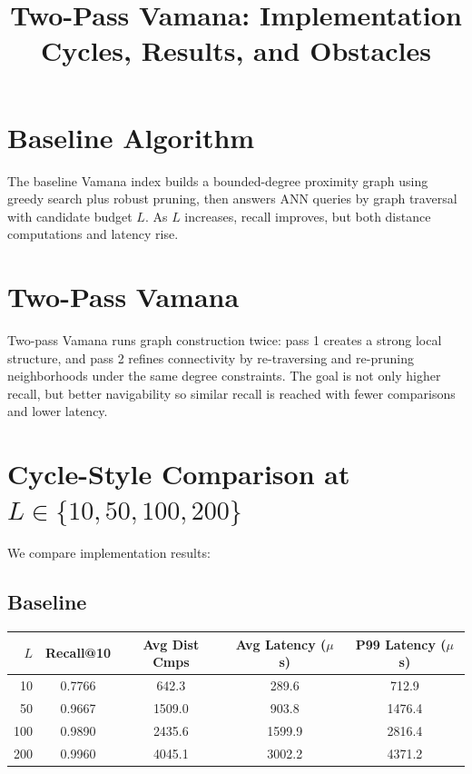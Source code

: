 \documentclass[11pt]{article}
\title{Two-Pass Vamana: Implementation Cycles, Results, and Obstacles}
\begin{document}
\maketitle

\section*{Baseline Algorithm}
The baseline Vamana index builds a bounded-degree proximity graph using greedy search plus robust pruning, then answers ANN queries by graph traversal with candidate budget $L$. As $L$ increases, recall improves, but both distance computations and latency rise.

\section*{Two-Pass Vamana}
Two-pass Vamana runs graph construction twice: pass 1 creates a strong local structure, and pass 2 refines connectivity by re-traversing and re-pruning neighborhoods under the same degree constraints. The goal is not only higher recall, but better navigability so similar recall is reached with fewer comparisons and lower latency.

\section*{Cycle-Style Comparison at $L\in\{10,50,100,200\}$}
We compare implementation results:

\subsection*{Baseline}
\begin{center}
\begin{tabular}{@{}rcccc@{}}
\toprule
$L$ & Recall@10 & Avg Dist Cmps & Avg Latency ($\mu$s) & P99 Latency ($\mu$s) \\
\midrule
10  & 0.7766 & 642.3  & 289.6  & 712.9 \\
50  & 0.9667 & 1509.0 & 903.8  & 1476.4 \\
100 & 0.9890 & 2435.6 & 1599.9 & 2816.4 \\
200 & 0.9960 & 4045.1 & 3002.2 & 4371.2 \\
\bottomrule
\end{tabular}
\end{center}
\end{document}
